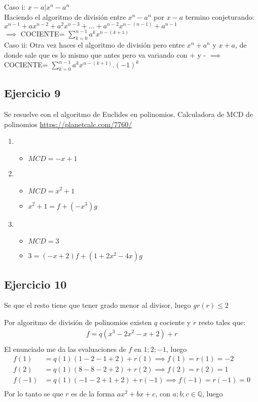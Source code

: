 Caso i: $x-a|x^{n}-a^{n}$ \\
Haciendo el algoritmo de división entre $x^{n}-a^{n}$ por $x-a$ termino conjeturando: $x^{n-1}+ax^{n-2}+a^{2}x^{n-3}+...+a^{n-2}x^{n-(n-1)}+a^{n-1}$ \\
$\implies$ COCIENTE= $\sum_{k=0}^{n-1}a^{k}x^{n-(k+1)}$ \\
Caso ii:
Otra vez haces el algoritmo de división pero entre $x^{n}+a^{n}$ y $x+a$, de donde sale que es lo mismo que antes pero va variando con + y -
$\implies$ COCIENTE= $\sum_{k=0}^{n-1}a^{k}x^{n-(k+1)}.(-1)^{k}$


\subsection{Ejercicio 9}

Se resuelve con el algoritmo de Euclides en polinomios. Calculadora de MCD de polinomios \url{https://planetcalc.com/7760/}

\begin{enumerate}
    \item \begin{itemize}
        \item $ MCD = -x+1 $
    \end{itemize}
    \item \begin{itemize}
        \item $ MCD = x^2 + 1 $
        \item $ x^2 + 1 = f + (-x^3)g $
    \end{itemize}
    \item \begin{itemize}
        \item $ MCD = 3 $
        \item $ 3 = (-x+2)f + (1+2x^2 - 4x)g $
    \end{itemize}
\end{enumerate}

\subsection{Ejercicio 10}

Se que el resto tiene que tener grado menor al divisor, luego $ gr(r) \leq 2 $

Por algoritmo de división de polinomios existen $ q $ cociente y $ r $ resto tales que:
\begin{align*}
    f = q(x^3-2x^2-x+2) + r \\
\end{align*}
El enunciado me da las evaluaciones de $f$ en $ 1; 2; -1 $, luego
\begin{align*}
    f(1) &= q(1)(1-2-1+2) + r(1) \implies f(1) = r(1) = -2 \\ 
    f(2) &= q(1)(8-8-2+2) + r(2) \implies f(2) = r(2) = 1 \\ 
    f(-1) &= q(1)(-1-2+1+2) + r(-1) \implies f(-1) = r(-1) = 0 \\ 
\end{align*}
Por lo tanto se que $ r $ es de la forma $ ax^2 + bx + c $, con $ a;b;c \in \mathbb{Q} $, luego

